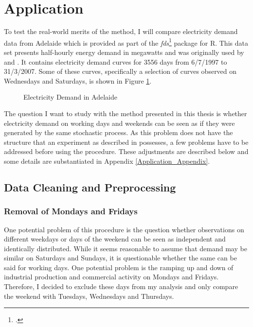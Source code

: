 \documentclass[12pt, a4paper]{article}
\theoremstyle{MAstyle} \newtheorem{assumption}{Assumption}[section]
\theoremstyle{MAstyle} \newtheorem{definition}{Definition}[section]
\theoremstyle{MAstyle} \newtheorem{theorem}{Theorem}[section]
\begin{document}
	\section{Application}\label{Application}
		To test the real-world merits of the method, I will compare electricity demand data from Adelaide which is provided as part of the \textit{fds}\footcite{fds} package for R. This data set presents half-hourly energy demand in megawatts and was originally used by \cite{magnano_generation_2007} and \cite{magnano_generation_2008}. It contains electricity demand curves for 3556 days from 6/7/1997 to 31/3/2007. Some of these curves, specifically a selection of curves observed on Wednesdays and Saturdays, is shown in Figure \ref{electricity_demand}.
		\begin{figure}[H]
			\caption{Electricity Demand in Adelaide}
			\label{electricity_demand}
		\end{figure}
	
		The question I want to study with the method presented in this thesis is whether electricity demand on working days and weekends can be seen as if they were generated by the same stochastic process. As this problem does not have the structure that an experiment as described in \cite{bugni_permutation_2021} possesses, a few problems have to be addressed before using the procedure. These adjustments are described below and some details are substantiated in Appendix \ref{Application_Appendix}.
	
		\subsection{Data Cleaning and Preprocessing}
			\subsubsection{Removal of Mondays and Fridays}
			One potential problem of this procedure is the question whether observations on different weekdays or days of the weekend can be seen as independent and identically distributed. While it seems reasonable to assume that demand may be similar on Saturdays and Sundays, it is questionable whether the same can be said for working days. 
			One potential problem is the ramping up and down of industrial production and commercial activity on Mondays and Fridays. Therefore, I decided to exclude these days from my analysis and only compare the weekend with Tuesdays, Wednesdays and Thursdays.
			
\end{document}
